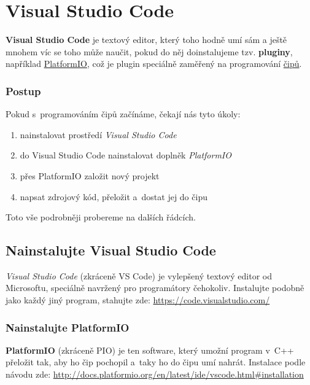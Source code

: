  \section{Visual Studio Code} \label{vscode}
 
 \textbf{Visual Studio Code} je textový editor, který toho hodně umí sám a ještě mnohem víc se toho může naučit, pokud do něj doinstalujeme tzv. \textbf{pluginy}, 
 například  \hyperref[platformio]{PlatformIO}, což je plugin speciálně zaměřený na programování \hyperref[cip]{čipů}. 
 
 \subsubsection*{Postup}
 
 Pokud s~programováním čipů začínáme, čekají nás tyto úkoly:
 \begin{enumerate}
 	\item  nainstalovat prostředí {\it Visual Studio Code}
 	\item  do Visual Studio Code nainstalovat doplněk {\it PlatformIO }
 	\item  přes PlatformIO založit nový projekt
 	\item  napsat zdrojový kód, přeložit a~dostat jej do čipu 
 \end{enumerate}
 Toto vše podrobněji probereme na dalších řádcích. 
 
 \label{vsc} \subsection{Nainstalujte  Visual Studio Code} 
 

 {\it Visual Studio Code}  (zkráceně VS Code) 
 je vylepšený textový editor od Microsoftu, speciálně navržený pro programátory čehokoliv.
 Instalujte podobně jako každý jiný program, stahujte zde: \url{https://code.visualstudio.com/}  
 
 
 \subsubsection{Nainstalujte PlatformIO} \label{platformio}
 
  \textbf{PlatformIO} (zkráceně PIO) je ten software, který umožní program v~C++ 
 přeložit tak, aby ho čip pochopil a~taky ho do čipu umí nahrát. 
 Instalace podle návodu zde: \url{http://docs.platformio.org/en/latest/ide/vscode.html\#installation}
 
